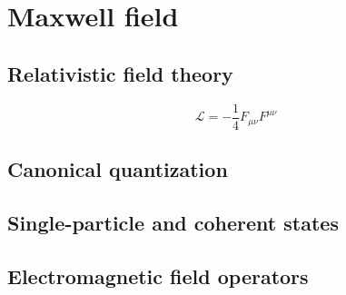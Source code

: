 \section{Maxwell field}

\subsection{Relativistic field theory}

\begin{equation}
	\mathcal{L}
	=
	-
	\frac{1}{4}
	F_{\mu\nu}
	F^{\mu\nu}
	\label{eq:mw_lagrangian}
\end{equation}

\subsection{Canonical quantization}

\subsection{Single-particle and coherent states}

\subsection{Electromagnetic field operators}
